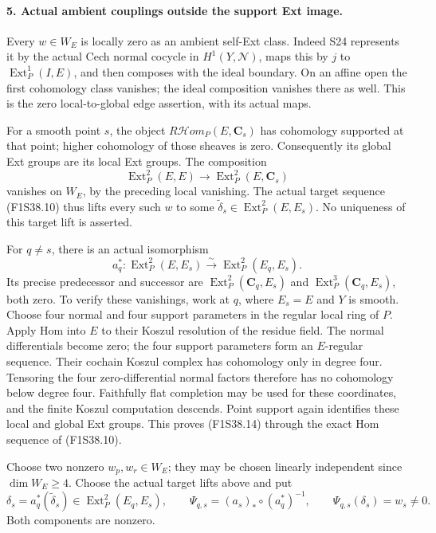 \paragraph{5. Actual ambient couplings outside the support Ext image.}
Every $w\in W_E$ is locally zero as an ambient self-Ext class.
Indeed S24 represents it by the actual Cech normal cocycle in
$H^1(Y,\mathscr N)$, maps this by $j$ to
$\operatorname{Ext}^1_P(I,E)$, and then composes with the ideal
boundary. On an affine open the first cohomology class vanishes;
the ideal composition vanishes there as well. This is the
zero local-to-global edge assertion, with its actual maps.

For a smooth point $s$, the object
$R\mathcal Hom_P(E,\mathbf C_s)$ has cohomology supported at
that point; higher cohomology of those sheaves is zero.
Consequently its global Ext groups are its local Ext groups.
The composition
\[
 \operatorname{Ext}^2_P(E,E)\longrightarrow
                        \operatorname{Ext}^2_P(E,\mathbf C_s)
 \tag{F1S38.13}
\]
vanishes on $W_E$, by the preceding local vanishing.
The actual target sequence (F1S38.10) thus lifts every such $w$
to some $\widetilde\delta_s\in\operatorname{Ext}^2_P(E,E_s)$.
No uniqueness of this target lift is asserted.

For $q\ne s$, there is an actual isomorphism
\[
 a_q^*:\operatorname{Ext}^2_P(E,E_s)
                 \xrightarrow{\sim}\operatorname{Ext}^2_P(E_q,E_s).
 \tag{F1S38.14}
\]
Its precise predecessor and successor are
$\operatorname{Ext}^2_P(\mathbf C_q,E_s)$ and
$\operatorname{Ext}^3_P(\mathbf C_q,E_s)$, both zero.
To verify these vanishings, work at $q$, where $E_s=E$ and
$Y$ is smooth. Choose four normal and four support parameters
in the regular local ring of $P$. Apply Hom into $E$ to their
Koszul resolution of the residue field. The normal differentials
become zero; the four support parameters form an $E$-regular
sequence. Their cochain Koszul complex has cohomology only in
degree four. Tensoring the four zero-differential normal factors
therefore has no cohomology below degree four. Faithfully flat
completion may be used for these coordinates, and the finite
Koszul computation descends. Point support again identifies
these local and global Ext groups. This proves (F1S38.14)
through the exact Hom sequence of (F1S38.10).

Choose two nonzero $w_p,w_r\in W_E$; they may be chosen
linearly independent since $\dim W_E\ge4$.
Choose the actual target lifts above and put
\[
 \delta_s=a_q^*(\widetilde\delta_s)
                   \in\operatorname{Ext}^2_P(E_q,E_s),\qquad
 \Psi_{q,s}=(a_s)_*\circ(a_q^*)^{-1},
 \qquad \Psi_{q,s}(\delta_s)=w_s\ne0.
 \tag{F1S38.15}
\]
Both components are nonzero.

